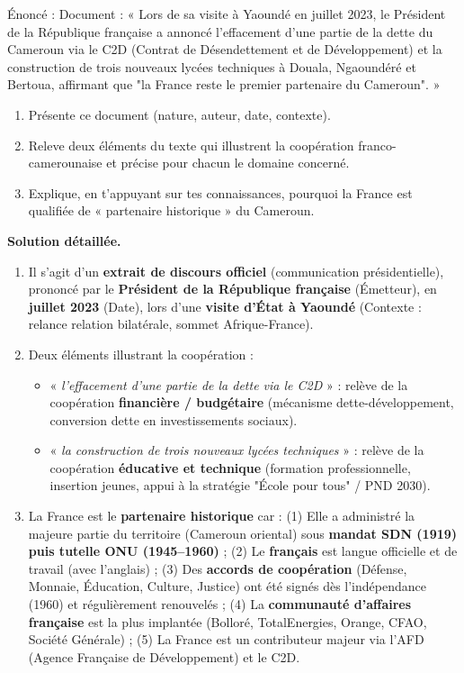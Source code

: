 \documentclass[11pt]{article}
\newcommand{\cle}[1]{{\popxbold\color{popdark}#1}}
\begin{document}
\begin{exoresolu}
Énoncé : Document : « Lors de sa visite à Yaoundé en juillet 2023, le Président de la République française a annoncé l'effacement d'une partie de la dette du Cameroun via le C2D (Contrat de Désendettement et de Développement) et la construction de trois nouveaux lycées techniques à Douala, Ngaoundéré et Bertoua, affirmant que "la France reste le premier partenaire du Cameroun". »
\begin{enumerate}
\item Présente ce document (nature, auteur, date, contexte).
\item Releve deux éléments du texte qui illustrent la coopération franco-camerounaise et précise pour chacun le domaine concerné.
\item Explique, en t'appuyant sur tes connaissances, pourquoi la France est qualifiée de « partenaire historique » du Cameroun.
\end{enumerate}
\tcblower
\textbf{Solution détaillée.}
\begin{enumerate}
\item Il s'agit d'un \textbf{extrait de discours officiel} (communication présidentielle), prononcé par le \textbf{Président de la République française} (Émetteur), en \textbf{juillet 2023} (Date), lors d'une \textbf{visite d'État à Yaoundé} (Contexte : relance relation bilatérale, sommet Afrique-France).
\item Deux éléments illustrant la coopération :
\begin{itemize}
\item « \emph{l'effacement d'une partie de la dette via le C2D} » : relève de la coopération \textbf{financière / budgétaire} (mécanisme dette-développement, conversion dette en investissements sociaux).
\item « \emph{la construction de trois nouveaux lycées techniques} » : relève de la coopération \textbf{éducative et technique} (formation professionnelle, insertion jeunes, appui à la stratégie "École pour tous" / PND 2030).
\end{itemize}
\item La France est le \textbf{partenaire historique} car : (1) Elle a administré la majeure partie du territoire (Cameroun oriental) sous \textbf{mandat SDN (1919) puis tutelle ONU (1945--1960)} ; (2) Le \textbf{français} est langue officielle et de travail (avec l'anglais) ; (3) Des \textbf{accords de coopération} (Défense, Monnaie, Éducation, Culture, Justice) ont été signés dès l'indépendance (1960) et régulièrement renouvelés ; (4) La \textbf{communauté d'affaires française} est la plus implantée (Bolloré, TotalEnergies, Orange, CFAO, Société Générale) ; (5) La France est un contributeur majeur via l'\cle{AFD} (Agence Française de Développement) et le \cle{C2D}.

\end{enumerate}
\end{exoresolu}
\end{document}
